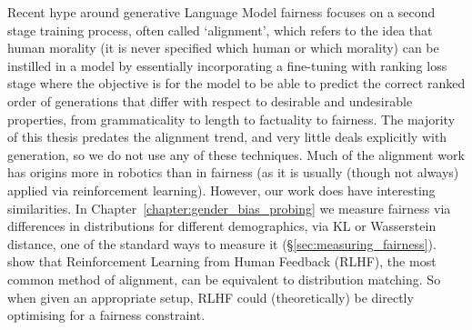 Recent hype around generative Language Model fairness focuses on a second stage training process, often called `alignment', which refers to the idea that human morality (it is never specified which human or which morality) can be instilled in a model by essentially incorporating a fine-tuning with ranking loss stage where the objective is for the model to be able to predict the correct ranked order of generations that differ with respect to desirable and undesirable properties, from grammaticality to length to factuality to fairness. The majority of this thesis predates the alignment trend, and very little deals explicitly with generation, so we do not use any of these techniques. Much of the alignment work has origins more in robotics than in fairness (as it is usually (though not always) applied via reinforcement learning). However, our work does have interesting similarities. In Chapter~\ref{chapter:gender_bias_probing} we measure fairness via differences in distributions for different demographics, via KL or Wasserstein distance, one of the standard ways to measure it (\S \ref{sec:measuring_fairness}). \citet{korbak2022on} show that Reinforcement Learning from Human Feedback (RLHF), the most common method of alignment, can be equivalent to distribution matching. So when given an appropriate setup, RLHF could (theoretically) be directly optimising for a fairness constraint.




